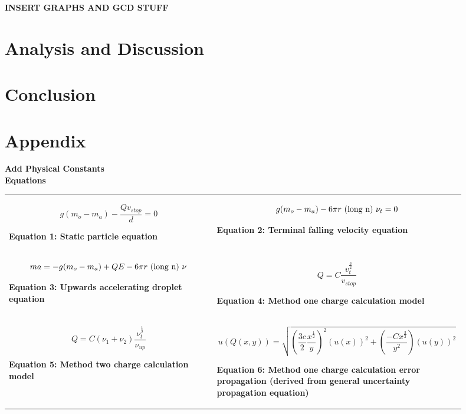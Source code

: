 \documentclass[
	letterpaper, %
	10pt, %
]{CSUniSchoolLabReport}
\begin{document}
{\LARGE\textbf{INSERT GRAPHS AND GCD STUFF}}
\section{Analysis and Discussion}
\section{Conclusion}
\newpage
\section{Appendix}
{\LARGE\textbf{Add Physical Constants}}\\
{\Large\textbf{Equations}}\\

\begin{tabular}{p{0.45\linewidth} p{0.45\linewidth}}
    $$g(m_o-m_a)-\frac{Qv_{stop}}{d}=0$$
    \begin{center}
        \textbf{Equation 1: Static particle equation}
    \end{center}
    &
    $$g(m_o-m_a)-6\pi r {\ \rm (long\ n)\ }\nu_t=0$$
    \begin{center}
        \textbf{Equation 2: Terminal falling velocity equation}
    \end{center}
    \\
    $$ma=-g(m_o-m_a)+QE- 6\pi r {\ \rm (long\ n)\ }\nu$$
    \begin{center}
        \textbf{Equation 3: Upwards accelerating droplet equation}
    \end{center}
    &
    $$Q = C \frac{v_t^{\frac{3}{2}}}{v_{stop}}$$
    \begin{center}
        \textbf{Equation 4: Method one charge calculation model}
    \end{center}
    \\
    $$Q = C(\nu_1 + \nu_2)\frac{\nu_t^\frac{1}{2}}{\nu_{up}}$$
    \begin{center}
        \textbf{Equation 5: Method two charge calculation model}
    \end{center}
    &
    $$u(Q(x,y)) = \sqrt{\left(\frac{3c}{2}\frac{x^\frac{1}{2}}{y}\right)^2(u(x))^2 + \left(\frac{-Cx^\frac{3}{2}}{y^2}\right)(u(y))^2}$$
    \begin{center}
        \textbf{Equation 6: Method one charge calculation error propagation (derived from general uncertainty propagation equation)}
    \end{center}
\end{tabular}\\
\end{document}

